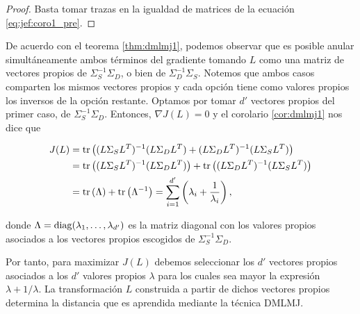 \documentclass{book}
\begin{document}
\begin{proof}
	Basta tomar trazas en la igualdad de matrices de la ecuación \ref{eq:jef:coro1_pre}.

\end{proof}

De acuerdo con el teorema \ref{thm:dmlmj1}, podemos observar que es posible anular simultáneamente ambos términos del gradiente tomando $L$ como una matriz de vectores propios de $\Sigma_S^{-1}\Sigma_D$, o bien de $\Sigma_D^{-1}\Sigma_S$. Notemos que ambos casos comparten los mismos vectores propios y cada opción tiene como valores propios los inversos de la opción restante. Optamos por tomar $d'$ vectores propios del primer caso, de $\Sigma_S^{-1}\Sigma_D$. Entonces, $\nabla J(L) = 0$ y el corolario \ref{cor:dmlmj1} nos dice que

\begin{align*}
	J(L) &= \operatorname{tr}\left( (L\Sigma_S L^T)^{-1} (L\Sigma_D L^T) + (L \Sigma_D L^T)^{-1} (L \Sigma_S L^T) \right) \\
	     &= \operatorname{tr}\left( (L\Sigma_S L^T)^{-1} (L\Sigma_D L^T)\right) + \operatorname{tr}\left((L \Sigma_D L^T)^{-1} (L \Sigma_S L^T) \right) \\
	     &= \operatorname{tr}\left(\Lambda\right) + \operatorname{tr}\left(\Lambda^{-1}\right) = \sum\limits_{i=1}^{d'} \left( \lambda_i + \frac{1}{\lambda_i} \right),
\end{align*}

donde $\Lambda = \operatorname{diag}(\lambda_1,\dots,\lambda_{d'})$ es la matriz diagonal con los valores propios asociados a los vectores propios escogidos de $\Sigma_S^{-1}\Sigma_D$.

Por tanto, para maximizar $J(L)$ debemos seleccionar los $d'$ vectores propios asociados a los $d'$ valores propios $\lambda$ para los cuales sea mayor la expresión $\lambda + 1/\lambda$. La transformación $L$ construida a partir de dichos vectores propios determina la distancia que es aprendida mediante la técnica DMLMJ.
\end{document}
